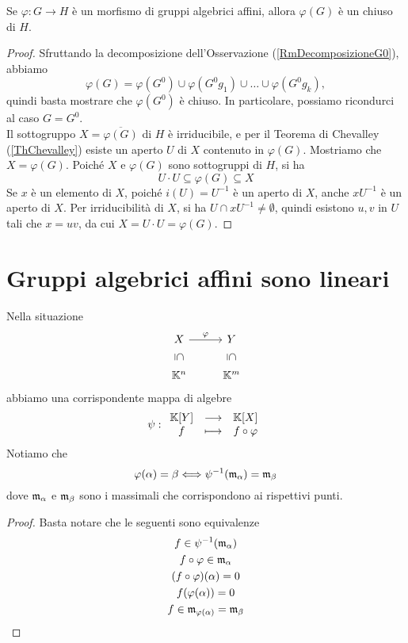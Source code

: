 \begin{proposition}\label{PrMorfismoTraGruppiAlgebriciAffiniHaImmagineChiusa}
    Se $\varphi\colon G \to H$ è un morfismo di gruppi algebrici affini, allora $\varphi(G)$ è un chiuso di $H$.
\end{proposition}
\begin{proof}
    Sfruttando la decomposizione dell'Osservazione (\ref{RmDecomposizioneG0}), abbiamo
    \[\varphi(G)=\varphi(G^0) \cup \varphi(G^0 g_1) \cup \ldots\cup \varphi(G^0g_k),\]
    quindi basta mostrare che $\varphi(G^0)$ è chiuso. In particolare, possiamo ricondurci al caso $G=G^0$. \\
    Il sottogruppo $X=\overline{\varphi(G)}$ di $H$ è irriducibile, e per il Teorema di Chevalley (\ref{ThChevalley}) esiste un aperto $U$ di $X$ contenuto in $\varphi(G)$. Mostriamo che $X=\varphi(G)$. Poiché $X$ e $\varphi(G)$ sono sottogruppi di $H$, si ha \[U\cdot U \subseteq \varphi(G)\subseteq X\]
    Se $x$ è un elemento di $X$, poiché $i(U)=U^{-1}$ è un aperto di $X$, anche $xU^{-1}$ è un aperto di $X$. Per irriducibilità di $X$, si ha $U\cap xU^{-1} \ne \emptyset$, quindi esistono $u,v$ in $U$ tali che $x=uv$, da cui $X=U\cdot U =\varphi(G)$.
\end{proof}




\section{Gruppi algebrici affini sono lineari}
\begin{remark}\label{RmPuntiEMassimaliSonoLaStessaCosa}
Nella situazione
\[\begin{tikzcd}
	X & Y \\
	{\K^n} & {\K^m}
	\arrow["\vp", from=1-1, to=1-2]
	\arrow["\subseteq"{marking, allow upside down}, draw=none, from=1-1, to=2-1]
	\arrow["\subseteq"{marking, allow upside down}, draw=none, from=1-2, to=2-2]
\end{tikzcd}\]
abbiamo una corrispondente mappa di algebre
\[\psi:\begin{array}{ccc} {\mathbb{K}[Y]} & \longrightarrow & {\mathbb{K}[X]}\\ {f} & \longmapsto & {f\circ \varphi} \end{array}\]
Notiamo che
\[\varphi(\alpha)=\beta\Longleftrightarrow \psi^{-1}(\mathfrak{m}_\alpha)=\mathfrak{m}_\beta\]
dove $\mathfrak{m}_\alpha$ e $\mathfrak{m}_\beta$ sono i massimali che corrispondono ai rispettivi punti.
\end{remark}
\begin{proof}
Basta notare che le seguenti sono equivalenze
\begin{gather*}
    f\in\psi^{-1}(\mathfrak{m}_\alpha)\\
    f\circ \varphi\in \mathfrak{m}_\alpha\\
    (f\circ \varphi)(\alpha)=0\\
    f(\varphi(\alpha))=0\\
    f\in \mathfrak{m}_{\varphi(\alpha)}=\mathfrak{m}_\beta
\end{gather*}
\end{proof}

